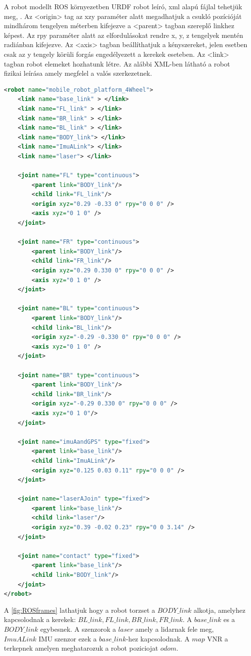 A robot modellt ROS környezetben URDF robot leíró, xml alapú fájlal tehetjük meg, \cite{rosURDF}
\cite{rosJoint} \cite{rosLink}.
Az <origin> tag az xzy paraméter alatt megadhatjuk a csukló pozícióját mindhárom tengelyen méterben kifejezve a <parent> tagban szereplő linkhez képest. Az rpy paraméter alatt az elfordulásokat rendre x, y, z tengelyek mentén radiánban kifejezve.
Az <axis> tagban beállíthatjuk a kényszereket, jelen esetben csak az y tengely körüli forgás engedélyezett a kerekek eseteben. 
Az <link> tagban robot elemeket hozhatunk létre. Az alábbi XML-ben látható a robot fizikai leírása amely megfelel a valós szerkezetnek.
\begin{lstlisting}[language=XML]
<robot name="mobile_robot_platform_4Wheel">
	<link name="base_link" > </link>
	<link name="FL_link" > </link>
	<link name="BR_link" > </link>
	<link name="BL_link" > </link>
	<link name="BODY_link"> </link>  
	<link name="ImuALink"> </link>  
	<link name="laser"> </link> 

	<joint name="FL" type="continuous">
		<parent link="BODY_link"/>
		<child link="FL_link"/>    
		<origin xyz="0.29 -0.33 0" rpy="0 0 0" />
		<axis xyz="0 1 0" />
	</joint>

	<joint name="FR" type="continuous">
		<parent link="BODY_link"/>
		<child link="FR_link"/>    
		<origin xyz="0.29 0.330 0" rpy="0 0 0" />
		<axis xyz="0 1 0" />
	</joint>

	<joint name="BL" type="continuous">
		<parent link="BODY_link"/>
		<child link="BL_link"/>
		<origin xyz="-0.29 -0.330 0" rpy="0 0 0" />
		<axis xyz="0 1 0" />
	</joint>

	<joint name="BR" type="continuous">
		<parent link="BODY_link"/>
		<child link="BR_link"/>     
		<origin xyz="-0.29 0.330 0" rpy="0 0 0" />
		<axis xyz="0 1 0"/>
	</joint>

	<joint name="imuAandGPS" type="fixed">
		<parent link="base_link"/>
		<child link="ImuALink"/>
		<origin xyz="0.125 0.03 0.11" rpy="0 0 0" />
	</joint>

	<joint name="laserAJoin" type="fixed">
		<parent link="base_link"/>
		<child link="laser"/>
		<origin xyz="0.39 -0.02 0.23" rpy="0 0 3.14" />
	</joint>  

	<joint name="contact" type="fixed">
		<parent link="base_link"/>
		<child link="BODY_link"/>
	</joint> 
</robot>
\end{lstlisting}

A \ref{fig:ROSframes} lathatjuk hogy a robot torzset a $BODY\_link$ alkotja, amelyhez kapcsolodnak a kerekek: $BL\_link,FL\_link,BR\_link,FR\_link$. A $base\_link$ es a $BODY\_link$ egybesnek. A szenzorok a $laser$ amely a lidarnak fele meg, $ImuALink$ IMU szenzor ezek a $base\_link$-hez kapcsolodnak.
A $map$ VNR a terkepnek amelyen meghatarozuk a robot poziciojat $odom$.

\renewcommand{\img}{SajatRobot/ROS/frames.svg}
\renewcommand{\sources}{*}
\renewcommand{\svg}{svg}
\renewcommand{\aspectratioPic}{1.5}
\renewcommand{\rotationAnglePic}{90}
\renewcommand{\captionn}{A megvalositott robot VNR-k közti reláció }
\renewcommand{\figlabel}{ROSframes}




